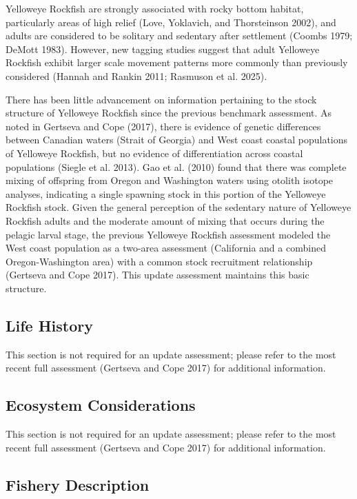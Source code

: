 \documentclass[
]{scrartcl}
\begin{document}
Yelloweye Rockfish are strongly associated with rocky bottom habitat,
particularly areas of high relief (Love, Yoklavich, and Thorsteinson
2002), and adults are considered to be solitary and sedentary after
settlement (Coombs 1979; DeMott 1983). However, new tagging studies
suggest that adult Yelloweye Rockfish exhibit larger scale movement
patterns more commonly than previously considered (Hannah and Rankin
2011; Rasmuson et al. 2025).

There has been little advancement on information pertaining to the stock
structure of Yelloweye Rockfish since the previous benchmark assessment.
As noted in Gertseva and Cope (2017), there is evidence of genetic
differences between Canadian waters (Strait of Georgia) and West coast
coastal populations of Yelloweye Rockfish, but no evidence of
differentiation across coastal populations (Siegle et al. 2013). Gao et
al. (2010) found that there was complete mixing of offspring from Oregon
and Washington waters using otolith isotope analyses, indicating a
single spawning stock in this portion of the Yelloweye Rockfish stock.
Given the general perception of the sedentary nature of Yelloweye
Rockfish adults and the moderate amount of mixing that occurs during the
pelagic larval stage, the previous Yelloweye Rockfish assessment modeled
the West coast population as a two-area assessment (California and a
combined Oregon-Washington area) with a common stock recruitment
relationship (Gertseva and Cope 2017). This update assessment maintains
this basic structure.

\subsection{Life History}\label{life-history}

This section is not required for an update assessment; please refer to
the most recent full assessment (Gertseva and Cope 2017) for additional
information.

\subsection{Ecosystem Considerations}\label{ecosystem-considerations-1}

This section is not required for an update assessment; please refer to
the most recent full assessment (Gertseva and Cope 2017) for additional
information.

\subsection{Fishery Description}\label{fishery-description}
\end{document}
